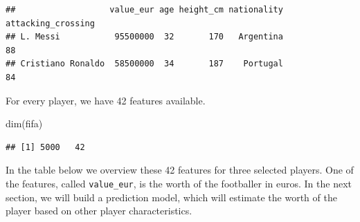 \documentclass[
]{scrbook}
\newenvironment{Shaded}{\begin{snugshade}}{\end{snugshade}}
\newcommand{\FunctionTok}[1]{\textcolor[rgb]{0.00,0.00,0.00}{#1}}
\newcommand{\NormalTok}[1]{#1}
\renewenvironment{Shaded} {\begin{snugshade}\small} {\end{snugshade}}
\begin{document}
\begin{verbatim}
##                   value_eur age height_cm nationality attacking_crossing
## L. Messi           95500000  32       170   Argentina                 88
## Cristiano Ronaldo  58500000  34       187    Portugal                 84
\end{verbatim}

For every player, we have 42 features available.

\begin{Shaded}
\begin{Highlighting}[]
\FunctionTok{dim}\NormalTok{(fifa)}
\end{Highlighting}
\end{Shaded}

\begin{verbatim}
## [1] 5000   42
\end{verbatim}

In the table below we overview these 42 features for three selected players.
One of the features, called \texttt{value\_eur}, is the worth of the footballer in euros. In the next section, we will build a prediction model, which will estimate the worth of the player based on other player characteristics.
\end{document}
